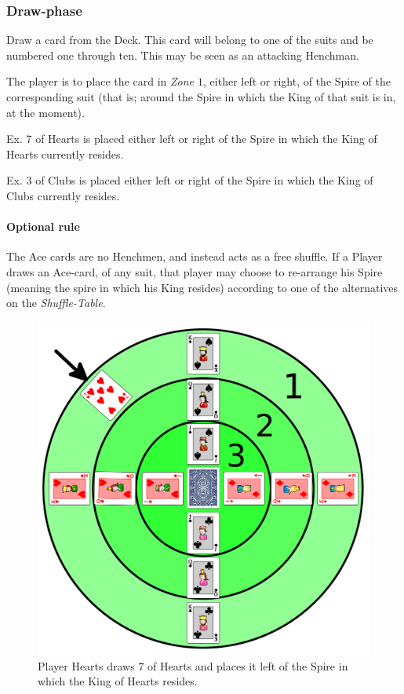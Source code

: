\subsubsection{Draw-phase}
\label{sec:playingshufflespires_drawphase}
Draw a card from the Deck.
This card will belong to one of the suits and be numbered one through ten.
This may be seen as an attacking Henchman.

The player is to place the card in \textit{Zone $1$}, either left or right, of the Spire of the corresponding suit (that is; around the Spire in which the King of that suit is in, at the moment).

Ex. $7$ of Hearts is placed either left or right of the Spire in which the King of Hearts currently resides.

Ex. $3$ of Clubs is placed either left or right of the Spire in which the King of Clubs currently resides.

\paragraph{Optional rule}
The Ace cards are no Henchmen, and instead acts as a free shuffle.
If a Player draws an Ace-card, of any suit, that player may choose to re-arrange his Spire (meaning the spire in which his King resides) according to one of the alternatives on the \textit{Shuffle-Table}.

\begin{figure}[h!]
	\centering
	\includegraphics[width=\linewidth]{img/draw.png}
	\caption{Player Hearts draws $7$ of Hearts and places it left of the Spire in which the King of Hearts resides.}
	\label{fig:draw}
\end{figure}

